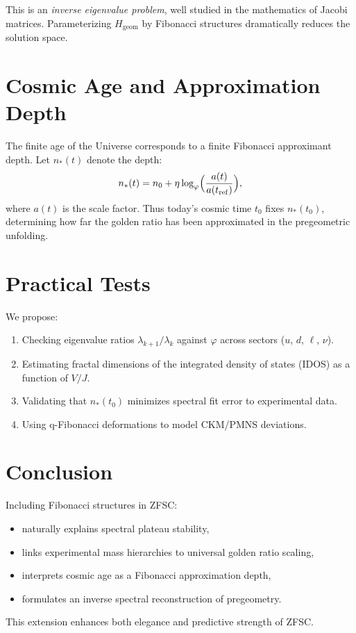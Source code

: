\documentclass[12pt,a4paper]{article}
\begin{document}
This is an \emph{inverse eigenvalue problem}, well studied in the mathematics of Jacobi matrices. Parameterizing $H_{\text{geom}}$ by Fibonacci structures dramatically reduces the solution space.

\section{Cosmic Age and Approximation Depth}
The finite age of the Universe corresponds to a finite Fibonacci approximant depth. Let $n_*(t)$ denote the depth:
\[
n_*(t) = n_0 + \eta \log_{\varphi}\!\Big(\frac{a(t)}{a(t_{\rm ref})}\Big),
\]
where $a(t)$ is the scale factor.  
Thus today’s cosmic time $t_0$ fixes $n_*(t_0)$, determining how far the golden ratio has been approximated in the pregeometric unfolding.

\section{Practical Tests}
We propose:
\begin{enumerate}
    \item Checking eigenvalue ratios $\lambda_{k+1}/\lambda_k$ against $\varphi$ across sectors ($u$, $d$, $\ell$, $\nu$).
    \item Estimating fractal dimensions of the integrated density of states (IDOS) as a function of $V/J$.
    \item Validating that $n_*(t_0)$ minimizes spectral fit error to experimental data.
    \item Using q-Fibonacci deformations to model CKM/PMNS deviations.
\end{enumerate}

\section{Conclusion}
Including Fibonacci structures in ZFSC:
\begin{itemize}
    \item naturally explains spectral plateau stability,
    \item links experimental mass hierarchies to universal golden ratio scaling,
    \item interprets cosmic age as a Fibonacci approximation depth,
    \item formulates an inverse spectral reconstruction of pregeometry.
\end{itemize}

This extension enhances both elegance and predictive strength of ZFSC.
\end{document}

